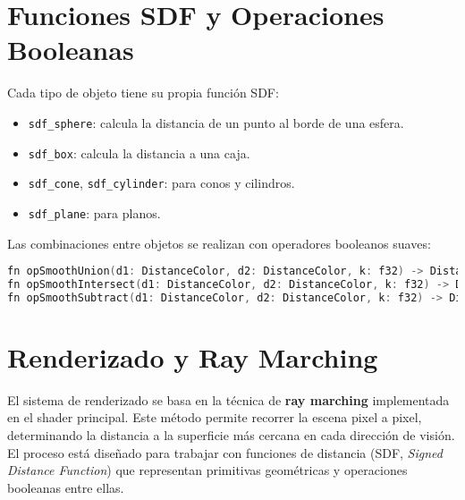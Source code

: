 \section{Funciones SDF y Operaciones Booleanas}

Cada tipo de objeto tiene su propia función SDF:

\begin{itemize}
    \item \texttt{sdf\_sphere}: calcula la distancia de un punto al borde de una esfera.
    \item \texttt{sdf\_box}: calcula la distancia a una caja.
    \item \texttt{sdf\_cone}, \texttt{sdf\_cylinder}: para conos y cilindros.
    \item \texttt{sdf\_plane}: para planos.
\end{itemize}

Las combinaciones entre objetos se realizan con operadores booleanos suaves:

\begin{lstlisting}[language=C++, caption={Operadores booleanos suaves}]
fn opSmoothUnion(d1: DistanceColor, d2: DistanceColor, k: f32) -> DistanceColor { ... }
fn opSmoothIntersect(d1: DistanceColor, d2: DistanceColor, k: f32) -> DistanceColor { ... }
fn opSmoothSubtract(d1: DistanceColor, d2: DistanceColor, k: f32) -> DistanceColor { ... }
\end{lstlisting}

\section{Renderizado y Ray Marching}

El sistema de renderizado se basa en la técnica de \textbf{ray marching}
implementada en el shader principal. Este método permite recorrer la escena
pixel a pixel, determinando la distancia a la superficie más cercana en cada
dirección de visión. El proceso está diseñado para trabajar con funciones de
distancia (SDF, \textit{Signed Distance Function}) que representan primitivas
geométricas y operaciones booleanas entre ellas.

